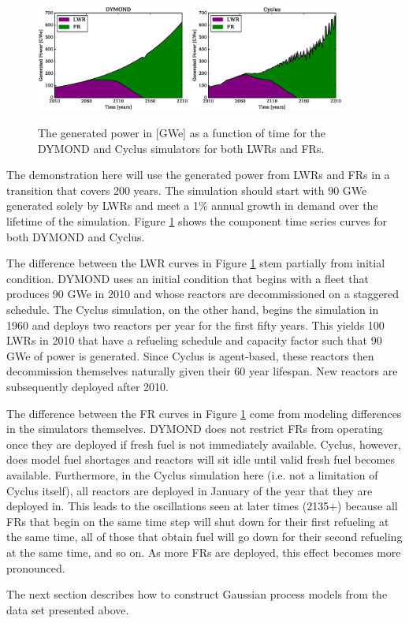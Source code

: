 \begin{figure}[htb]
\centering
\includegraphics[width=0.45\textwidth]{gwe-dymond.eps}
\includegraphics[width=0.45\textwidth]{gwe-cyclus.eps}
\caption{The generated power in [GWe] as a function of time for the DYMOND and 
Cyclus simulators for both LWRs and FRs.}
\label{gwe-simulators}
\end{figure}

The demonstration here will use the generated power from LWRs and FRs in 
a transition that covers 200 years. The simulation should start with
90 GWe generated solely by LWRs and meet a 1\% annual growth in demand over the 
lifetime of the simulation. Figure \ref{gwe-simulators} shows the component time 
series curves for both DYMOND and Cyclus. 

The difference between the LWR curves in Figure \ref{gwe-simulators} stem 
partially from initial condition. DYMOND uses an initial condition that 
begins with a fleet that produces 90 GWe in 2010 and whose reactors are 
decommissioned on a staggered schedule. The Cyclus simulation, on the other 
hand, begins the simulation in 1960 and deploys two reactors per year for
the first fifty years. This yields 100 LWRs in 2010 that have a refueling 
schedule and capacity factor such that 90 GWe of power is generated. Since
Cyclus is agent-based, these reactors then decommission themselves naturally
given their 60 year lifespan. New reactors are subsequently deployed after
2010.

The difference between the FR curves in Figure \ref{gwe-simulators} come
from modeling differences in the simulators themselves. DYMOND does not 
restrict FRs from operating once they are deployed if fresh fuel is not 
immediately available. Cyclus, however, does model fuel shortages and 
reactors will sit idle until valid fresh fuel becomes available. Furthermore, 
in the Cyclus simulation here (i.e. not a limitation of Cyclus itself), 
all reactors are deployed in January of the year that they are deployed in.
This leads to the oscillations seen at later times (2135+) because all 
FRs that begin on the same time step will shut down for their first
refueling at the same time, all of those that obtain fuel will go down for 
their second refueling at the same time, and so on. As more FRs are deployed, 
this effect becomes more pronounced.

The next section describes how to
construct Gaussian process models from the data set presented above.

\clearpage
